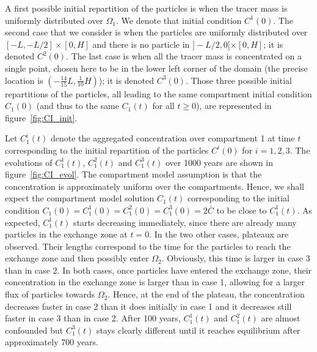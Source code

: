 A first possible initial repartition of the particles is when the tracer mass is uniformly distributed over $\Omega_1$. We denote that initial condition $C^1(0)$. The second case that we consider is when the particles are uniformly distributed over $[-L,-L/2]\times[0,H]$ and there is no particle in $]-L/2,0[\times[0,H]$; it is denoted $C^2(0)$. The last case is when all the tracer mass is concentrated on a single point, chosen here to be in the lower left corner of the domain (the precise location is $(-\frac{14}{15}L,\frac{1}{10}H)$); it is denoted $C^3(0)$. Those three possible initial repartitions of the particles, all leading to the same compartment initial condition $C_1(0)$ (and thus to the same $C_1(t)$ for all $t \ge 0$), are represented in figure~\ref{fig:CI_init}. 

Let $C_1^i(t)$ denote the aggregated concentration over compartment 1 at time $t$ corresponding to the initial repartition of the particles $C^i(0)$ for $i = 1,2,3$. The evolutions of $C^1_1(t)$, $C^2_1(t)$ and $C^3_1(t)$ over 1000 years are shown in figure~\ref{fig:CI_evol}. The compartment model assumption is that the concentration is approximately uniform over the compartments. Hence, we shall expect the compartment model solution $C_1(t)$ corresponding to the initial condition $C_1(0) = C^1_1(0) = C^2_1(0) = C^3_1(0) = 2\bar C$ to be close to $C^1_1(t)$. As expected, $C_1^1(t)$ starts decreasing immediately, since there are already many particles in the exchange zone at $t=0$. In the two other cases, plateaux are observed. Their lengths correspond to the time for the particles to reach the exchange zone and then possibly enter $\Omega_2$. Obviously, this time is larger in case 3 than in case 2. In both cases, once particles have entered the exchange zone, their concentration in the exchange zone is larger than in case 1, allowing for a larger flux of particles towards $\Omega_2$. Hence, at the end of the plateau, the concentration decreases faster in case 2 than it does initially in case 1 and it decreases still faster in case 3 than in case 2. After 100 years, $C^1_1(t)$ and $C^2_1(t)$ are almost confounded but $C^3_1(t)$ stays clearly different until it reaches equilibrium after approximately 700 years.

